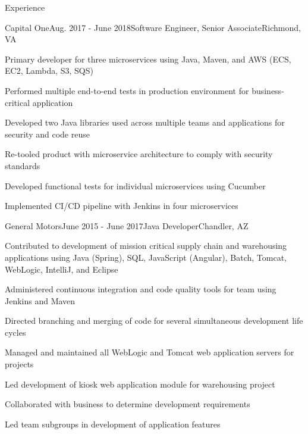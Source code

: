 \documentclass{resume} %
\begin{document}
\begin{rSection}{Experience}
\begin{rSubsection}{Capital One}{Aug. 2017 - June 2018}{Software Engineer, Senior Associate}{Richmond, VA}
	\vspace{-0.5em}\setlength{\itemindent}{.0in}\item{ 
		Primary developer for three microservices using Java, Maven, and AWS (ECS, EC2, Lambda, S3, SQS)
	}
	\setlength{\itemindent}{.0in}\item{
		Performed multiple end-to-end tests in production environment for business-critical application
	}
	\setlength{\itemindent}{.0in}\item{
		Developed two Java libraries used across multiple teams and applications for security and code reuse
	}
	\setlength{\itemindent}{.0in}\item{
		Re-tooled product with microservice architecture to comply with security standards
	}
	\setlength{\itemindent}{.0in}\item{
		Developed functional tests for individual microservices using Cucumber
	}
	\setlength{\itemindent}{.0in}\item{
		Implemented CI/CD pipeline with Jenkins in four microservices
	}

\end{rSubsection}

\begin{rSubsection}{General Motors}{June 2015 - June 2017}{Java Developer}{Chandler, AZ}
	\vspace{-0.5em}\setlength{\itemindent}{.0in}\item {
		Contributed to development of mission critical supply chain and warehousing applications using
		\newline
		Java (Spring), SQL, JavaScript (Angular), Batch, Tomcat, WebLogic, IntelliJ, and Eclipse
	}
	\setlength{\itemindent}{.0in}\item{
		Administered continuous integration and code quality tools for team using Jenkins and Maven
	}
	\setlength{\itemindent}{.0in}\item{
		Directed branching and merging of code for several simultaneous development life cycles
	}
	\setlength{\itemindent}{.0in}\item{
		Managed and maintained all WebLogic and Tomcat web application servers for projects
	}
	\setlength{\itemindent}{.0in}\item{
		Led development of kiosk web application module for warehousing project
	}
	\setlength{\itemindent}{.0in}\item{
		Collaborated with business to determine development requirements
	}
	\setlength{\itemindent}{.0in}\item{
		Led team subgroups in development of application features
	}


\end{rSubsection}
\end{rSection}
\end{document}
